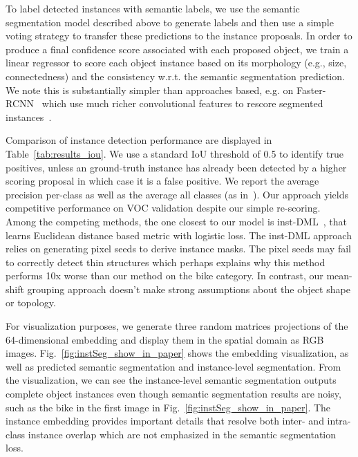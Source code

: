 \documentclass[10pt,twocolumn,letterpaper]{article}
\begin{document}
To label detected instances with semantic labels, we use the semantic
segmentation model described above to generate labels and then use a simple
voting strategy to transfer these predictions to the instance proposals.  In
order to produce a final confidence score associated with each proposed object,
we train a linear regressor to score each object instance based on its
morphology (e.g., size, connectedness) and the consistency w.r.t. the semantic
segmentation prediction. We note this is substantially simpler than approaches
based, e.g. on Faster-RCNN~\cite{ren2015faster} which use much richer convolutional features to
rescore segmented instances~\cite{he2017mask}.

Comparison of instance detection performance are displayed in
Table~\ref{tab:results_iou}.  We use a standard IoU threshold of 0.5 to
identify true positives, unless an ground-truth instance has already been
detected by a higher scoring proposal in which case it is a false positive.  We
report the average precision per-class as well as the average all classes (as
in~\cite{hariharan2011semantic}).  Our approach yields competitive performance
on VOC validation despite our simple re-scoring.  Among the competing methods,
the one closest to our model is inst-DML~\cite{fathi2017semantic}, that learns
Euclidean distance based metric with logistic loss.  The inst-DML approach
relies on generating pixel seeds to derive instance masks.  The pixel seeds may
fail to correctly detect thin structures which perhaps explains why this method
performs 10x worse than our method on the bike category. In contrast, our
mean-shift grouping approach doesn't make strong assumptions about the
object shape or topology.

For visualization purposes, we generate three random matrices projections of
the 64-dimensional embedding and display them in the spatial domain as RGB
images.  Fig.~\ref{fig:instSeg_show_in_paper} shows the embedding
visualization, as well as predicted semantic segmentation and instance-level
segmentation.  From the visualization, we can see the instance-level semantic
segmentation outputs complete object instances even though semantic
segmentation results are noisy, such as the bike in the first image in
Fig.~\ref{fig:instSeg_show_in_paper}. The instance embedding provides
important details that resolve both inter- and intra-class instance overlap
which are not emphasized in the semantic segmentation loss.
\end{document}
